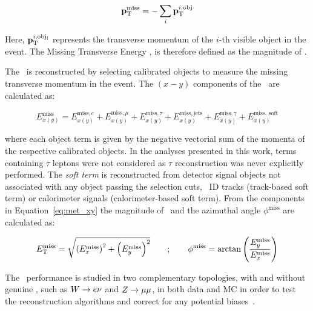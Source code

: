 			\begin{equation}
				\mathbf{p}_\mathrm{T}^\mathrm{miss} = - \sum_i \mathbf{p}_\mathrm{T}^{i, \mathrm{obj}}
				\label{eq:ptmiss}
			\end{equation}

			\noindent Here, $\mathbf{p}_\mathrm{T}^{i, \mathrm{obj_i}}$ represents the transverse momentum of the $i$-th visible object in the event. The Missing Transverse Energy \met, is therefore defined as the magnitude of \ptmiss. 

			The \met\ is reconstructed by selecting calibrated objects to measure the missing transverse momentum in the event. The $(x-y)$ components of the \met\ are calculated as: 

			\begin{equation}
				E_{x(y)}^{\mathrm{miss}} = E_{x(y)}^{\mathrm{miss}, e} + E_{x(y)}^{\mathrm{miss}, \mu} + E_{x(y)}^{\mathrm{miss}, \tau} + E_{x(y)}^{\mathrm{miss, jets}} + E_{x(y)}^{\mathrm{miss}, \gamma} + E_{x(y)}^{\mathrm{miss,\,soft}}
				\label{eq:met_xy}
			\end{equation}

			where each object term is given by the negative vectorial sum of the momenta of the respective calibrated objects. In the analyses presented in this work, terms containing $\tau$ leptons were not considered as $\tau$ reconstruction was never explicitly performed. The \emph{soft term} is reconstructed from detector signal objects not associated with any object passing the selection cuts, \eg\ \ac{ID} tracks (track-based soft term) or calorimeter signals (calorimeter-based soft term). From the components in Equation~\ref{eq:met_xy} the magnitude of \met\ and the azimuthal angle $\phi^{\mathrm{miss}}$ are calculated as:

			\begin{eqnarray}
				E_{\mathrm{T}}^{\mathrm{miss}} = \sqrt{ \left(E_{x}^{\mathrm{miss}}\right)^2 + \left(E_{y}^{\mathrm{miss}} \right)^2 } \qquad ; \qquad
				\phi^{\mathrm{miss}} = \arctan \left ( \frac{E_y^{\mathrm{miss}}}{E_x^{\mathrm{miss}}} \right )
			\end{eqnarray}

			The \met\ performance is studied in two complementary topologies, with and without genuine \met, such as $W \rightarrow e\nu$ and $Z \rightarrow \mu\mu$, in both data and \ac{MC} in order to test the reconstruction algorithms and correct for any potential biases~\cite{ATLASMet2015}. 

			